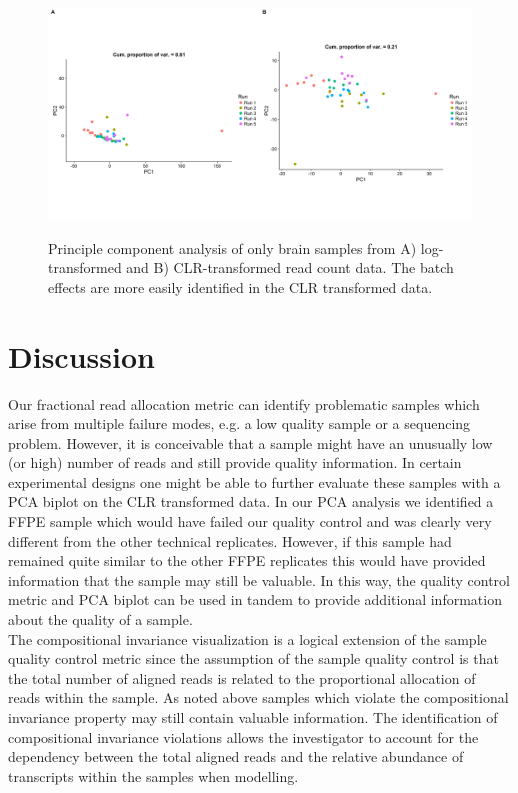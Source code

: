 \begin{figure}
\includegraphics[scale=0.4]{./Figures/IO_PCA_Brain_logRaw_CLR}
\label{rawPCAbrain}
\caption{Principle component analysis of only brain samples from A) log-transformed and B) CLR-transformed read count data. The batch effects are more easily identified in the CLR transformed data.}
\end{figure}



\FloatBarrier
\section{Discussion}

Our fractional read allocation metric can identify problematic samples which arise from multiple failure modes, e.g. a low quality sample or a sequencing problem.  However, it is conceivable that a sample might have an unusually low (or high) number of reads and still provide quality information.  In certain experimental designs one might be able to further evaluate these samples with a PCA biplot on the CLR transformed data. In our PCA analysis we identified a FFPE sample which would have failed our quality control and was clearly very different from the other technical replicates.  However, if this sample had remained quite similar to the other FFPE replicates this would have provided information that the sample may still be valuable.  In this way, the quality control metric and PCA biplot can be used in tandem to provide additional information about the quality of a sample.\\

The compositional invariance visualization is a logical extension of the sample quality control metric since the assumption of the sample quality control is that the total number of aligned reads is related to the proportional allocation of reads within the sample.  As noted above samples which violate the compositional invariance property may still contain valuable information.  The identification of compositional invariance violations allows the investigator to account for the dependency between the total aligned reads and the relative abundance of transcripts within the samples when modelling.

